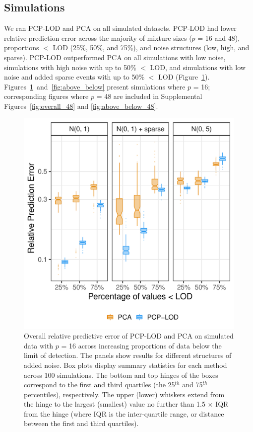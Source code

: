\subsection{Simulations} We ran PCP-LOD and PCA on all simulated datasets. PCP-LOD had lower relative prediction error across the majority of  mixture sizes ($p$ = 16 and 48), proportions $<$ LOD (25\%, 50\%, and 75\%), and noise structures (low, high, and sparse). PCP-LOD outperformed PCA on all simulations with low noise, simulations with high noise with up to 50\% $<$ LOD, and simulations with low noise and added sparse events with up to 50\% $<$ LOD (Figure~\ref{fig:overall}). Figures~\ref{fig:overall}~and~\ref{fig:above_below} present simulations where $p$ = 16; corresponding figures where $p$ = 48 are included in Supplemental Figures~\ref{fig:overall_48} and \ref{fig:above_below_48}.

\begin{figure}
    \centering
\includegraphics[width=.85\textwidth]{figures/sim_boxplots_16.pdf}
   \caption[Overall relative prediction error of PCP-LOD and PCA  ($p$ = 16)]{Overall relative predictive error of PCP-LOD and PCA on simulated data with $p$ = 16 across increasing proportions of data below the limit of detection. The panels show results for different structures of added noise. Box plots display summary statistics for each method across 100 simulations. The bottom and top hinges of the boxes correspond to the first and third quartiles (the 25$^{th}$ and 75$^{th}$ percentiles), respectively. The upper (lower) whiskers extend from the hinge to the largest (smallest) value no further than 1.5 $\times$ IQR from the hinge (where IQR is the inter-quartile range, or distance between the first and third quartiles).}
    \label{fig:overall}
\end{figure}

